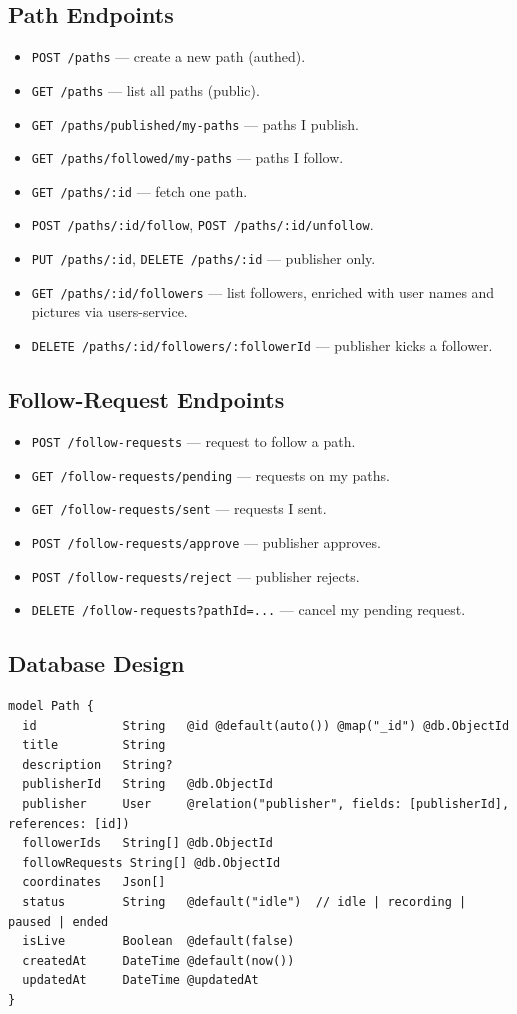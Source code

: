\documentclass[11pt,a4paper]{article}
\begin{document}
\subsection{Path Endpoints}
\begin{itemize}[leftmargin=*]
  \item \texttt{POST /paths} — create a new path (authed).
  \item \texttt{GET /paths} — list all paths (public).
  \item \texttt{GET /paths/published/my-paths} — paths I publish.
  \item \texttt{GET /paths/followed/my-paths} — paths I follow.
  \item \texttt{GET /paths/:id} — fetch one path.
  \item \texttt{POST /paths/:id/follow}, \texttt{POST /paths/:id/unfollow}.
  \item \texttt{PUT /paths/:id}, \texttt{DELETE /paths/:id} — publisher only.
  \item \texttt{GET /paths/:id/followers} — list followers, enriched with user names and pictures via users-service.
  \item \texttt{DELETE /paths/:id/followers/:followerId} — publisher kicks a follower.
\end{itemize}

\subsection{Follow-Request Endpoints}
\begin{itemize}[leftmargin=*]
  \item \texttt{POST /follow-requests} — request to follow a path.
  \item \texttt{GET /follow-requests/pending} — requests on my paths.
  \item \texttt{GET /follow-requests/sent} — requests I sent.
  \item \texttt{POST /follow-requests/approve} — publisher approves.
  \item \texttt{POST /follow-requests/reject} — publisher rejects.
  \item \texttt{DELETE /follow-requests?pathId=...} — cancel my pending request.
\end{itemize}

\subsection{Database Design}
\begin{lstlisting}[caption={Paths-service Prisma model.}]
model Path {
  id            String   @id @default(auto()) @map("_id") @db.ObjectId
  title         String
  description   String?
  publisherId   String   @db.ObjectId
  publisher     User     @relation("publisher", fields: [publisherId], references: [id])
  followerIds   String[] @db.ObjectId
  followRequests String[] @db.ObjectId
  coordinates   Json[]
  status        String   @default("idle")  // idle | recording | paused | ended
  isLive        Boolean  @default(false)
  createdAt     DateTime @default(now())
  updatedAt     DateTime @updatedAt
}
\end{lstlisting}
\end{document}
